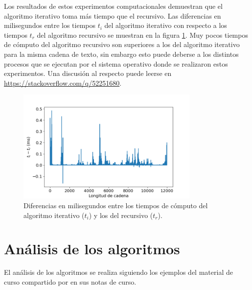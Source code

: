 \documentclass[paper=leter, fontsize=11pt]{scrartcl}
\numberwithin{equation}{section}		%
\numberwithin{figure}{section}			%
\numberwithin{table}{section}				%
\begin{document}
Los resultados de estos experimentos computacionales demuestran que el algoritmo iterativo toma más tiempo que el recursivo. Las diferencias en milisegundos entre los tiempos $t_i$ del algoritmo iterativo con respecto a los tiempos $t_r$ del algoritmo recursivo se muestran en la figura \ref{dif_i_r}. Muy pocos tiempos de cómputo del algoritmo recursivo son superiores a los del algoritmo iterativo para la misma cadena de texto, sin embargo esto puede deberse a los distintos procesos que se ejecutan por el sistema operativo donde se realizaron estos experimentos. Una discusión al respecto puede leerse en \url{https://stackoverflow.com/q/52251680}.

\begin{figure}
    \centering
    \includegraphics[width=0.8\textwidth]{dif_i_r.png}
    \caption{Diferencias en milisegundos entre los tiempos de cómputo del algoritmo iterativo ($t_i$) y los del recursivo ($t_r$).}
    \label{dif_i_r}
\end{figure}

\section{Análisis de los algoritmos}

El análisis de los algoritmos se realiza siguiendo los ejemplos del material de curso compartido por \citeauthor{aa} \cite{aa} en sus notas de curso.
\end{document}
